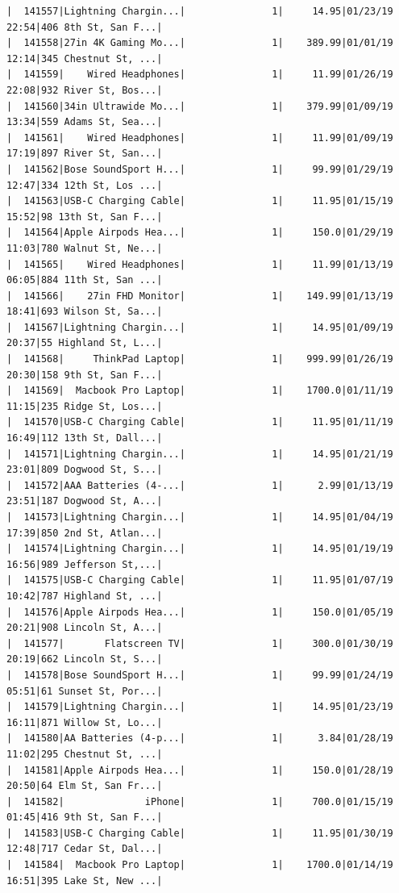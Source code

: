 \documentclass[
  letterpaper,
  DIV=11,
  numbers=noendperiod]{scrartcl}
\begin{document}
\begin{verbatim}
|  141557|Lightning Chargin...|               1|     14.95|01/23/19 22:54|406 8th St, San F...|
|  141558|27in 4K Gaming Mo...|               1|    389.99|01/01/19 12:14|345 Chestnut St, ...|
|  141559|    Wired Headphones|               1|     11.99|01/26/19 22:08|932 River St, Bos...|
|  141560|34in Ultrawide Mo...|               1|    379.99|01/09/19 13:34|559 Adams St, Sea...|
|  141561|    Wired Headphones|               1|     11.99|01/09/19 17:19|897 River St, San...|
|  141562|Bose SoundSport H...|               1|     99.99|01/29/19 12:47|334 12th St, Los ...|
|  141563|USB-C Charging Cable|               1|     11.95|01/15/19 15:52|98 13th St, San F...|
|  141564|Apple Airpods Hea...|               1|     150.0|01/29/19 11:03|780 Walnut St, Ne...|
|  141565|    Wired Headphones|               1|     11.99|01/13/19 06:05|884 11th St, San ...|
|  141566|    27in FHD Monitor|               1|    149.99|01/13/19 18:41|693 Wilson St, Sa...|
|  141567|Lightning Chargin...|               1|     14.95|01/09/19 20:37|55 Highland St, L...|
|  141568|     ThinkPad Laptop|               1|    999.99|01/26/19 20:30|158 9th St, San F...|
|  141569|  Macbook Pro Laptop|               1|    1700.0|01/11/19 11:15|235 Ridge St, Los...|
|  141570|USB-C Charging Cable|               1|     11.95|01/11/19 16:49|112 13th St, Dall...|
|  141571|Lightning Chargin...|               1|     14.95|01/21/19 23:01|809 Dogwood St, S...|
|  141572|AAA Batteries (4-...|               1|      2.99|01/13/19 23:51|187 Dogwood St, A...|
|  141573|Lightning Chargin...|               1|     14.95|01/04/19 17:39|850 2nd St, Atlan...|
|  141574|Lightning Chargin...|               1|     14.95|01/19/19 16:56|989 Jefferson St,...|
|  141575|USB-C Charging Cable|               1|     11.95|01/07/19 10:42|787 Highland St, ...|
|  141576|Apple Airpods Hea...|               1|     150.0|01/05/19 20:21|908 Lincoln St, A...|
|  141577|       Flatscreen TV|               1|     300.0|01/30/19 20:19|662 Lincoln St, S...|
|  141578|Bose SoundSport H...|               1|     99.99|01/24/19 05:51|61 Sunset St, Por...|
|  141579|Lightning Chargin...|               1|     14.95|01/23/19 16:11|871 Willow St, Lo...|
|  141580|AA Batteries (4-p...|               1|      3.84|01/28/19 11:02|295 Chestnut St, ...|
|  141581|Apple Airpods Hea...|               1|     150.0|01/28/19 20:50|64 Elm St, San Fr...|
|  141582|              iPhone|               1|     700.0|01/15/19 01:45|416 9th St, San F...|
|  141583|USB-C Charging Cable|               1|     11.95|01/30/19 12:48|717 Cedar St, Dal...|
|  141584|  Macbook Pro Laptop|               1|    1700.0|01/14/19 16:51|395 Lake St, New ...|

\end{verbatim}
\end{document}
